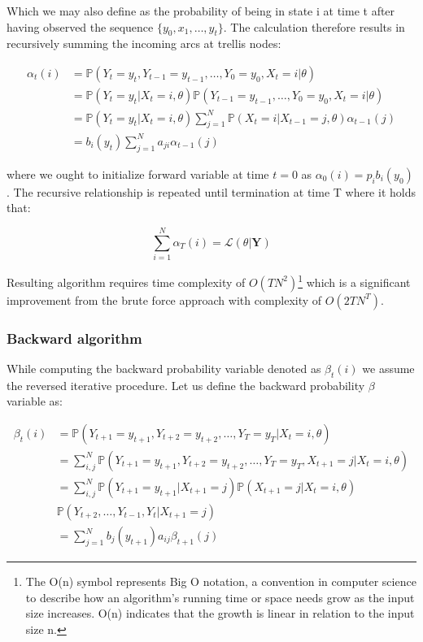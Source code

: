 Which we may also define as the probability of being in state i at time t after having observed the sequence $\{y_0,x_1,\ldots,y_t\}$. 
The calculation therefore results in recursively summing the incoming arcs at trellis nodes:

\begin{align}
    \alpha_t(i) &= \mathbb{P}(Y_t = y_t, Y_{t-1} = y_{t-1},\ldots, Y_0 = y_0 , X_t = i| \theta) \\ \nonumber
                &= \mathbb{P}(Y_t = y_t | X_t = i, \theta) \mathbb{P}(Y_{t-1} = y_{t-1},\ldots, Y_0 = y_0 , X_t = i| \theta)  \\ \nonumber
                &= \mathbb{P}(Y_t = y_t | X_t = i, \theta) \sum\limits_{j = 1}^N \mathbb{P}(X_t = i| X_{t-1}=j,\theta) \alpha_{t-1}(j)\\ \nonumber
                &= b_i(y_t) \sum\limits_{j=1}^N a_{ji} \alpha_{t-1}(j)
\end{align}

where we ought to initialize forward variable at time $t=0$ as $\alpha_0(i)= p_i b_i(y_0)$. 
The recursive relationship is repeated until termination at time T where it holds that:

\begin{equation} \label{eq:loglikeF}
    \sum_{i=1}^N \alpha_T(i) = \mathcal{L}( \theta| \textbf{Y})
\end{equation} 

Resulting algorithm requires time complexity of $O(TN^2)$\footnote{The O(n) symbol represents Big O notation, 
a convention in computer science to describe how an algorithm's running time or space needs grow as the input size increases. 
O(n) indicates that the growth is linear in relation to the input size n.} 
which is a significant improvement from the brute force approach with complexity of $O(2TN^T)$.

\subsubsection{Backward algorithm}

While computing the backward probability variable denoted as $\beta_t(i)$ we assume the reversed iterative procedure. 
Let us define the backward probability $\beta$ variable as:

\begin{align}
\beta_t(i)  &= \mathbb{P}(Y_{t+1} = y_{t+1}, Y_{t+2} = y_{t+2},\ldots, Y_T = y_T| X_t = i, \theta) \\ \nonumber
            &= \sum_{i,j}^N \mathbb{P}(Y_{t+1} = y_{t+1}, Y_{t+2} = y_{t+2},\ldots, Y_T = y_T,X_{t+1} = j | X_t = i, \theta)  \\ \nonumber
            &= \sum_{i,j}^N \mathbb{P}(Y_{t+1} = y_{t+1}| X_{t+1} = j) \mathbb{P}(X_{t+1} = j | X_t = i, \theta) \\ \nonumber
            & \mathbb{P}(Y_{t+2},\ldots,Y_{t-1},Y_t|X_{t+1}=j)  \\ \nonumber
            &= \sum_{j=1}^N b_j(y_{t+1})a_{ij} \beta_{t+1}(j)
\end{align}

